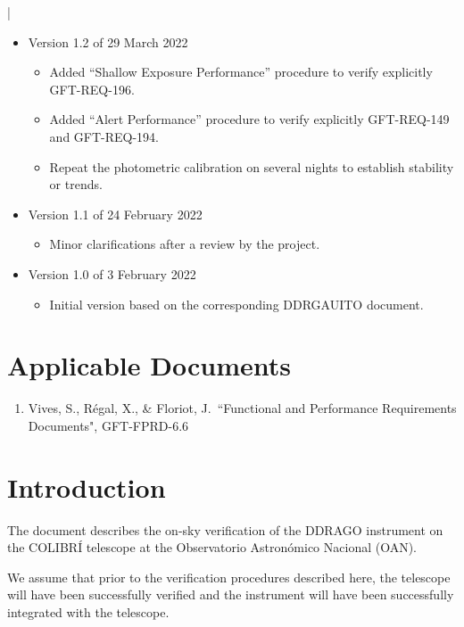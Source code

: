 |\documentclass{article}
\begin{document}
\begin{itemize}
\item Version 1.2 of 29 March 2022
\begin{itemize}
    \item Added “Shallow Exposure Performance” procedure to verify explicitly GFT-REQ-196.
    \item Added “Alert Performance” procedure to verify explicitly GFT-REQ-149 and GFT-REQ-194.
    \item Repeat the photometric calibration on several nights to establish stability or trends.
\end{itemize}
\item Version 1.1 of 24 February 2022
\begin{itemize}
    \item Minor clarifications after a review by the project.
\end{itemize}



\item Version 1.0 of 3 February 2022
\begin{itemize}
    \item Initial version based on the corresponding DDRGAUITO document.
\end{itemize}
\end{itemize}

\section*{Applicable Documents}

\begin{enumerate}[label={AD\arabic*}]
\item \label{FPRD} Vives, S., R\'egal, X., \& Floriot, J.\ ``Functional and Performance Requirements Documents", GFT-FPRD-6.6
\end{enumerate}

\clearpage


\section{Introduction}

The document describes the on-sky verification of the DDRAGO instrument on the COLIBRÍ telescope at the Observatorio Astronómico Nacional (OAN).

We assume that prior to the verification procedures described here, the telescope will have been successfully verified and the instrument will have been successfully integrated with the telescope.
\end{document}
